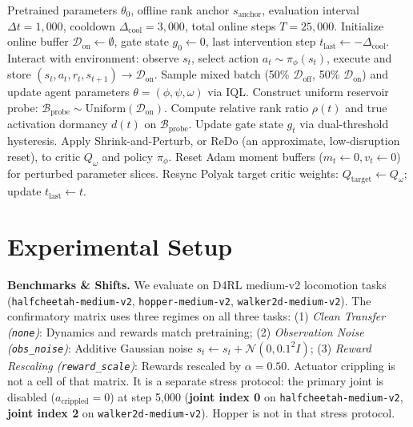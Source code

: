 \documentclass{article}
\begin{document}
\begin{algorithm}[t]
\caption{\textsc{CapacityGate}: Adaptive Capacity-Gated Intervention}
\label{alg:capacity_gate}
\begin{algorithmic}[1]
\REQUIRE Pretrained parameters $\theta_0$, offline rank anchor $s_{\mathrm{anchor}}$, evaluation interval $\Delta t = 1,000$, cooldown $\Delta_{\mathrm{cool}} = 3,000$, total online steps $T = 25,000$.
\STATE Initialize online buffer $\mathcal{D}_{\mathrm{on}} \leftarrow \emptyset$, gate state $g_0 \leftarrow 0$, last intervention step $t_{\mathrm{last}} \leftarrow -\Delta_{\mathrm{cool}}$.
    \STATE Interact with environment: observe $s_t$, select action $a_t \sim \pi_\phi(s_t)$, execute and store $(s_t, a_t, r_t, s_{t+1}) \to \mathcal{D}_{\mathrm{on}}$.
    \STATE Sample mixed batch (50\% $\mathcal{D}_{\mathrm{off}}$, 50\% $\mathcal{D}_{\mathrm{on}}$) and update agent parameters $\theta = (\phi, \psi, \omega)$ via IQL.
        \STATE Construct uniform reservoir probe: $\mathcal{B}_{\mathrm{probe}} \sim \mathrm{Uniform}(\mathcal{D}_{\mathrm{on}})$.
        \STATE Compute relative rank ratio $\rho(t)$ and true activation dormancy $d(t)$ on $\mathcal{B}_{\mathrm{probe}}$.
        \STATE Update gate state $g_t$ via dual-threshold hysteresis.
            \STATE Apply Shrink-and-Perturb, or ReDo (an approximate, low-disruption reset), to critic $Q_\omega$ and policy $\pi_\phi$.
            \STATE Reset Adam moment buffers ($m_t \leftarrow 0, v_t \leftarrow 0$) for perturbed parameter slices.
            \STATE Resync Polyak target critic weights: $Q_{\mathrm{target}} \leftarrow Q_\omega$; update $t_{\mathrm{last}} \leftarrow t$.
        \ENDIF
    \ENDIF
\ENDFOR
\end{algorithmic}
\end{algorithm}

\section{Experimental Setup}
\label{sec:setup}

\textbf{Benchmarks \& Shifts.} We evaluate on D4RL \citep{fu2020d4rl} medium-v2 locomotion tasks (\texttt{halfcheetah-medium-v2}, \texttt{hopper-medium-v2}, \texttt{walker2d-medium-v2}). The confirmatory matrix uses three regimes on all three tasks: (1) \emph{Clean Transfer (\texttt{none})}: Dynamics and rewards match pretraining; (2) \emph{Observation Noise (\texttt{obs\_noise})}: Additive Gaussian noise $s_t \leftarrow s_t + \mathcal{N}(0, 0.1^2 I)$; (3) \emph{Reward Rescaling (\texttt{reward\_scale})}: Rewards rescaled by $\alpha = 0.50$. Actuator crippling is not a cell of that matrix. It is a separate stress protocol: the primary joint is disabled ($a_{\mathrm{crippled}} = 0$) at step 5,000 (\textbf{joint index 0} on \texttt{halfcheetah-medium-v2}, \textbf{joint index 2} on \texttt{walker2d-medium-v2}). Hopper is not in that stress protocol.
\end{document}
